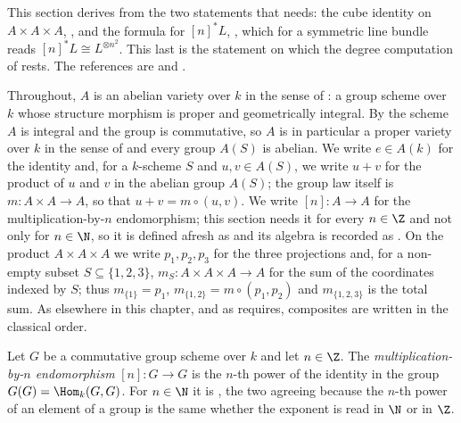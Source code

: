 This section derives from  the two statements that
 needs: the cube identity on $A\times A\times A$,
, and the formula for $[n]^*L$,
, which for a symmetric line bundle reads
$[n]^*L\cong L^{\otimes n^2}$.  This last is the statement on which the degree
computation of  rests.  The references are
\cite[\S6]{MumfordAbelianVarieties} and
\cite[I, \S\S5--7]{MilneAbelianVarieties}.

Throughout, $A$ is an abelian variety over $k$ in the sense of
: a group scheme over $k$ whose structure morphism
is proper and geometrically integral.  By  the scheme $A$
is integral and the group is commutative, so $A$ is in particular a proper
variety over $k$ in the sense of  and every group
$A(S)$ is abelian.  We write $e\in A(k)$ for the identity and, for a
$k$-scheme $S$ and $u,v\in A(S)$, we write $u+v$ for the product of $u$ and
$v$ in the abelian group $A(S)$; the group law itself is
$m\colon A\times A\to A$, so that $u+v=m\circ(u,v)$.  We write
$[n]\colon A\to A$ for the multiplication-by-$n$ endomorphism; this section
needs it for every $n\in\Z$ and not only for $n\in\N$, so it is defined
afresh as  and its algebra is recorded as
.  On the product $A\times A\times A$ we
write $p_1,p_2,p_3$ for
the three projections and, for a non-empty subset $S\subseteq\{1,2,3\}$,
$m_S\colon A\times A\times A\to A$ for the sum of the coordinates indexed by
$S$; thus $m_{\{1\}}=p_1$, $m_{\{1,2\}}=m\circ(p_1,p_2)$ and
$m_{\{1,2,3\}}$ is the total sum.  As elsewhere in this chapter, and as
 requires, composites are written in the
classical order.

\begin{definition}
\label{def:cube-mulby-int}
Let $G$ be a commutative group scheme over $k$ and let $n\in\Z$.  The
\emph{multiplication-by-$n$ endomorphism} $[n]\colon G\to G$ is the $n$-th
power of the identity in the group $G(G)=\Hom_k(G,G)$.  For $n\in\N$ it is
, the two agreeing because the $n$-th power of an element
of a group is the same whether the exponent is read in $\N$ or in $\Z$.
\end{definition}


